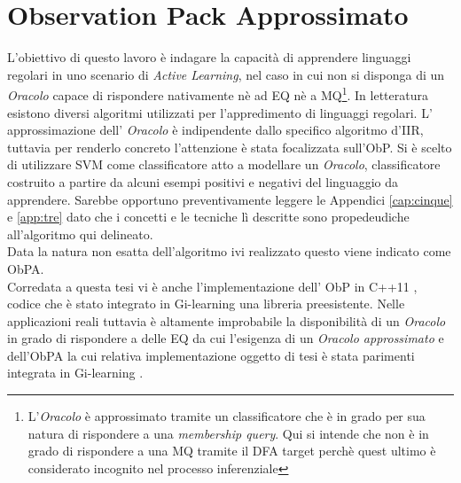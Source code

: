 
\chapter[OBP App.]{Observation Pack Approssimato} %
\label{cap:sei}
L'obiettivo di questo lavoro è indagare la capacità di apprendere linguaggi regolari in uno scenario di \textit{Active Learning}, nel caso in cui non si disponga di un \textit{Oracolo} capace di rispondere nativamente nè ad \ac{EQ} nè a \ac{MQ}\footnote{L'\textit{Oracolo} è approssimato tramite un classificatore che è in grado per sua natura di rispondere a una \textit{membership query}. Qui si intende che non è in grado di rispondere a una \ac{MQ} tramite il \ac{DFA} target perchè quest ultimo è considerato incognito nel processo inferenziale}.  
In letteratura esistono diversi algoritmi utilizzati per  l'appredimento di linguaggi regolari. 
L' approssimazione dell' \textit{Oracolo} è  indipendente dallo specifico algoritmo d'\ac{IIR}, tuttavia per renderlo concreto l'attenzione è stata focalizzata sull'\ac{ObP}.
 Si è scelto di utilizzare \ac{SVM} come classificatore atto a modellare un \textit{Oracolo}, classificatore costruito a partire da alcuni esempi positivi e negativi del linguaggio da apprendere. Sarebbe opportuno preventivamente leggere le Appendici \ref{cap:cinque}  e \ref{app:tre} dato che i concetti e le tecniche lì descritte sono propedeudiche all'algoritmo qui delineato.\\
 Data la natura non esatta dell'algoritmo ivi realizzato questo viene indicato come \ac{ObPA}.\\
  Corredata a questa tesi vi è anche l'implementazione dell' \ac{ObP} in C++11 , codice che è stato integrato in  Gi-learning \cite{Cot16} una libreria preesistente. Nelle applicazioni reali tuttavia è altamente improbabile la disponibilità di un \textit{Oracolo} in grado di rispondere a delle \ac{EQ} da cui l'esigenza di un \textit{Oracolo approssimato} e dell'\ac{ObPA} la cui relativa implementazione oggetto di tesi è stata parimenti integrata in  Gi-learning \cite{Cot16}.

